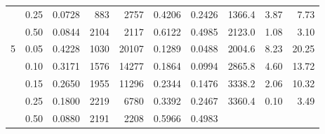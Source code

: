 \begin{table}[htbp]
\begin{tabular}{r r r r r r r r r r}
                           & 0.25                           & 0.0728                         & 883
                           & 2757                           & 0.4206                         & 0.2426
                           & 1366.4                         & 3.87
                           & 7.73                                                                     \\
                           & 0.50                           & 0.0844                         & 2104
                           & 2117                           & 0.6122                         & 0.4985
                           & 2123.0                         & 1.08
                           & 3.10                                                                     \\
    \midrule
    5                      & 0.05                           & 0.4228                         & 1030
                           & 20107                          & 0.1289                         & 0.0488
                           & 2004.6                         & 8.23
                           & 20.25                                                                    \\
                           & 0.10                           & 0.3171                         & 1576
                           & 14277                          & 0.1864                         & 0.0994
                           & 2865.8                         & 4.60
                           & 13.72                                                                    \\
                           & 0.15                           & 0.2650                         & 1955
                           & 11296                          & 0.2344                         & 0.1476
                           & 3338.2                         & 2.06
                           & 10.32                                                                    \\
                           & 0.25                           & 0.1800                         & 2219
                           & 6780                           & 0.3392                         & 0.2467
                           & 3360.4                         & 0.10
                           & 3.49                                                                     \\
                           & 0.50                           & 0.0880                         & 2191
                           & 2208                           & 0.5966                         & 0.4983

\end{tabular}
\end{table}
